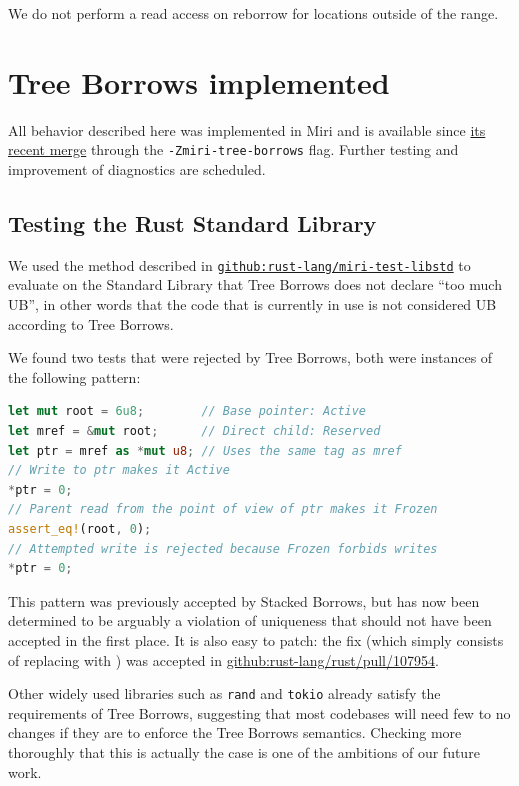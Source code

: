 \documentclass[a4paper,11pt]{article}
\theoremstyle{plain}
\theoremstyle{definition}
\theoremstyle{remark}
\newcommand{\tcode}[1]{\rstinline{#1}}
\begin{document}
We do not perform a read access on reborrow for locations outside of the range.

\section{Tree Borrows implemented}

All behavior described here was implemented in Miri and is available since
\href{https://github.com/rust-lang/miri/pull/2785}{its recent merge} through
the \texttt{-Zmiri-tree-borrows} flag. Further testing and improvement
of diagnostics are scheduled.

\subsection{Testing the Rust Standard Library}
\label{sec:testing_stdlib}

We used the method described in
\href{https://github.com/rust-lang/miri-test-libstd}{\texttt{github:rust-lang/miri-test-libstd}}
to evaluate on the Standard Library that Tree Borrows does not declare ``too much UB'',
in other words that the code that is currently in use is not considered UB according
to Tree Borrows.

We found two tests that were rejected by Tree Borrows, both were instances of the
following pattern:
\begin{lstlisting}[language=rust]
let mut root = 6u8;        // Base pointer: Active
let mref = &mut root;      // Direct child: Reserved
let ptr = mref as *mut u8; // Uses the same tag as mref
// Write to ptr makes it Active
*ptr = 0;
// Parent read from the point of view of ptr makes it Frozen
assert_eq!(root, 0);
// Attempted write is rejected because Frozen forbids writes
*ptr = 0;
\end{lstlisting}

This pattern was previously accepted by Stacked Borrows, but has now been determined
to be arguably a violation of uniqueness that should not have been accepted in the
first place. It is also easy to patch: the fix (which simply consists of
replacing \tcode{\&mut root as *mut _} with \tcode{addr\_of\_mut!(root)}) was accepted
in \href{https://github.com/rust-lang/rust/pull/107954}{github:rust-lang/rust/pull/107954}.


Other widely used libraries such as \texttt{rand} and \texttt{tokio} already
satisfy the requirements of Tree Borrows, suggesting that most codebases will
need few to no changes if they are to enforce the Tree Borrows semantics.
Checking more thoroughly that this is actually the case is one of the ambitions of our future
work.
\end{document}
